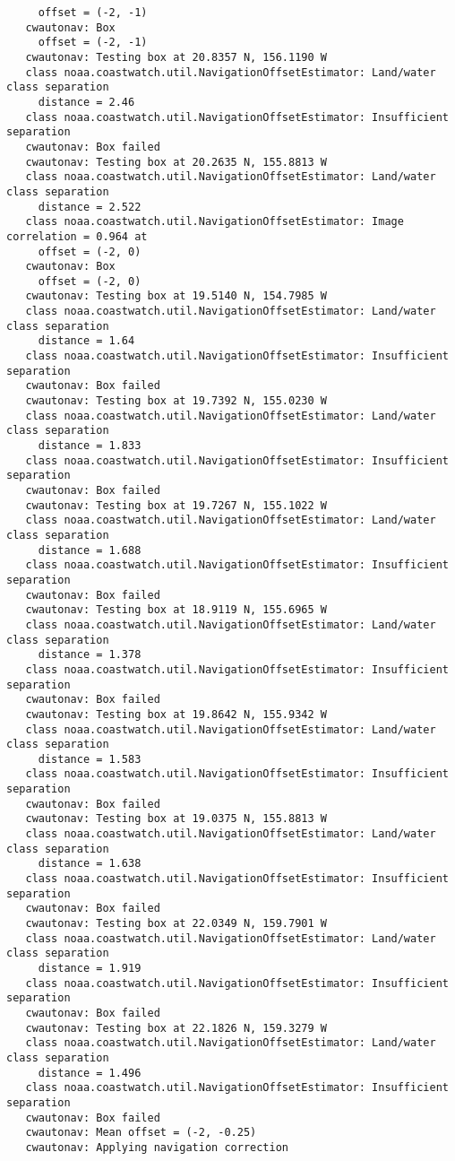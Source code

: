 \begin{verbatim}
     offset = (-2, -1)
   cwautonav: Box 
     offset = (-2, -1)
   cwautonav: Testing box at 20.8357 N, 156.1190 W
   class noaa.coastwatch.util.NavigationOffsetEstimator: Land/water class separation 
     distance = 2.46
   class noaa.coastwatch.util.NavigationOffsetEstimator: Insufficient separation
   cwautonav: Box failed
   cwautonav: Testing box at 20.2635 N, 155.8813 W
   class noaa.coastwatch.util.NavigationOffsetEstimator: Land/water class separation 
     distance = 2.522
   class noaa.coastwatch.util.NavigationOffsetEstimator: Image correlation = 0.964 at 
     offset = (-2, 0)
   cwautonav: Box 
     offset = (-2, 0)
   cwautonav: Testing box at 19.5140 N, 154.7985 W
   class noaa.coastwatch.util.NavigationOffsetEstimator: Land/water class separation 
     distance = 1.64
   class noaa.coastwatch.util.NavigationOffsetEstimator: Insufficient separation
   cwautonav: Box failed
   cwautonav: Testing box at 19.7392 N, 155.0230 W
   class noaa.coastwatch.util.NavigationOffsetEstimator: Land/water class separation 
     distance = 1.833
   class noaa.coastwatch.util.NavigationOffsetEstimator: Insufficient separation
   cwautonav: Box failed
   cwautonav: Testing box at 19.7267 N, 155.1022 W
   class noaa.coastwatch.util.NavigationOffsetEstimator: Land/water class separation 
     distance = 1.688
   class noaa.coastwatch.util.NavigationOffsetEstimator: Insufficient separation
   cwautonav: Box failed
   cwautonav: Testing box at 18.9119 N, 155.6965 W
   class noaa.coastwatch.util.NavigationOffsetEstimator: Land/water class separation 
     distance = 1.378
   class noaa.coastwatch.util.NavigationOffsetEstimator: Insufficient separation
   cwautonav: Box failed
   cwautonav: Testing box at 19.8642 N, 155.9342 W
   class noaa.coastwatch.util.NavigationOffsetEstimator: Land/water class separation 
     distance = 1.583
   class noaa.coastwatch.util.NavigationOffsetEstimator: Insufficient separation
   cwautonav: Box failed
   cwautonav: Testing box at 19.0375 N, 155.8813 W
   class noaa.coastwatch.util.NavigationOffsetEstimator: Land/water class separation 
     distance = 1.638
   class noaa.coastwatch.util.NavigationOffsetEstimator: Insufficient separation
   cwautonav: Box failed
   cwautonav: Testing box at 22.0349 N, 159.7901 W
   class noaa.coastwatch.util.NavigationOffsetEstimator: Land/water class separation 
     distance = 1.919
   class noaa.coastwatch.util.NavigationOffsetEstimator: Insufficient separation
   cwautonav: Box failed
   cwautonav: Testing box at 22.1826 N, 159.3279 W
   class noaa.coastwatch.util.NavigationOffsetEstimator: Land/water class separation 
     distance = 1.496
   class noaa.coastwatch.util.NavigationOffsetEstimator: Insufficient separation
   cwautonav: Box failed
   cwautonav: Mean offset = (-2, -0.25)
   cwautonav: Applying navigation correction
 
\end{verbatim}


